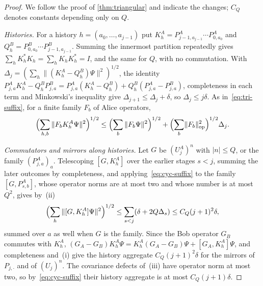 \begin{proof}
We follow the proof of \cref{thm:triangular} and indicate the changes; $C_Q$ denotes constants depending only on $Q$.

\emph{Histories.} For a history $h=(a_0,\dots,a_{j-1})$ put $K^A_h=P^A_{j-1,a_{j-1}}\cdots P^A_{0,a_0}$ and
$Q^B_h=P^B_{0,a_0}\cdots P^B_{j-1,a_{j-1}}$. Summing the innermost partition repeatedly gives $\sum_hK_h^*K_h=\sum_hK_hK_h^*=I$, and
the same for $Q$, with no commutation. With $\Delta_j=(\sum_h\|(K^A_h-Q^B_h)\Psi\|^2)^{1/2}$, the identity $P^A_{j,a}K^A_h-Q^B_hP^B_{j,a}=P^A_{j,a}(K^A_h-Q^B_h)+
Q^B_h(P^A_{j,a}-P^B_{j,a})$, completeness in each term and Minkowski's inequality give $\Delta_{j+1}\le\Delta_j+\delta$, so
$\Delta_j\le j\delta$. As in~\eqref{eq:tri-suffix}, for a finite family $F_b$ of Alice operators,
\begin{equation}\label{eq:cyc-suffix}
\Bigl(\sum_{h,b}\|F_bK^A_h\Psi\|^2\Bigr)^{1/2}\le\Bigl(\sum_b\|F_b\Psi\|^2\Bigr)^{1/2}+\Bigl(\sum_b\lVert F_b\rVert_{\mathrm{op}}^2\Bigr)^{1/2}\Delta_j .
\end{equation}

\emph{Commutators and mirrors along histories.} Let $G$ be $(U^A_j)^n$ with $|n|\le Q$, or the family $(P^A_{j,a})_a$. Telescoping
$[G,K^A_h]$ over the earlier stages $s<j$, summing the later outcomes by completeness, and applying~\eqref{eq:cyc-suffix} to the family
$[G,P^A_{s,b}]$, whose operator norms are at most two and whose number is at most $Q^2$, gives by~(ii)
\[
\Bigl(\sum_h\|[G,K^A_h]\Psi\|^2\Bigr)^{1/2}\le\sum_{s<j}(\delta+2Q\Delta_s)\le C_Q(j+1)^2\delta ,
\]
summed over $a$ as well when $G$ is the family. Since the Bob operator $G_B$ commutes with $K^A_h$,
$(G_A-G_B)K^A_h\Psi=K^A_h(G_A-G_B)\Psi+[G_A,K^A_h]\Psi$, and completeness and~(i) give the history aggregate
$C_Q(j+1)^2\delta$ for the mirrors of $P_{j,\cdot}$ and of $(U_j)^n$. The covariance defects of~(iii) have operator norm at most two,
so by~\eqref{eq:cyc-suffix} their history aggregate is at most $C_Q(j+1)\delta$.


\end{proof}
